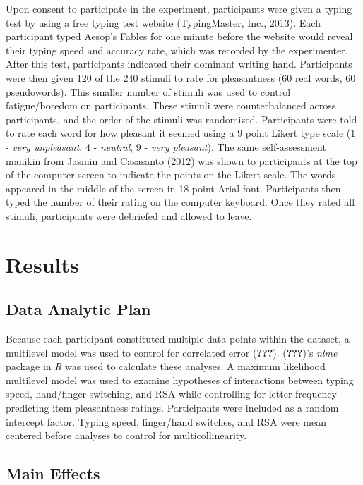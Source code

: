 \documentclass[english,man]{apa6}
\theoremstyle{definition}
\theoremstyle{definition}
\theoremstyle{definition}
\theoremstyle{remark}
\begin{document}
Upon consent to participate in the experiment, participants were given a
typing test by using a free typing test website (TypingMaster, Inc.,
2013). Each participant typed Aesop's Fables for one minute before the
website would reveal their typing speed and accuracy rate, which was
recorded by the experimenter. After this test, participants indicated
their dominant writing hand. Participants were then given 120 of the 240
stimuli to rate for pleasantness (60 real words, 60 pseudowords). This
smaller number of stimuli was used to control fatigue/boredom on
participants. These stimuli were counterbalanced across participants,
and the order of the stimuli was randomized. Participants were told to
rate each word for how pleasant it seemed using a 9 point Likert type
scale (1 - \emph{very unpleasant}, 4 - \emph{neutral}, 9 - \emph{very
pleasant}). The same self-assessment manikin from Jasmin and Casasanto
(2012) was shown to participants at the top of the computer screen to
indicate the points on the Likert scale. The words appeared in the
middle of the screen in 18 point Arial font. Participants then typed the
number of their rating on the computer keyboard. Once they rated all
stimuli, participants were debriefed and allowed to leave.

\section{Results}\label{results}

\subsection{Data Analytic Plan}\label{data-analytic-plan}

Because each participant constituted multiple data points within the
dataset, a multilevel model was used to control for correlated error
({\textbf{???}}). ({\textbf{???}})'s \emph{nlme} package in \emph{R} was
used to calculate these analyses. A maximum likelihood multilevel model
was used to examine hypotheses of interactions between typing speed,
hand/finger switching, and RSA while controlling for letter frequency
predicting item pleasantness ratings. Participants were included as a
random intercept factor. Typing speed, finger/hand switches, and RSA
were mean centered before analyses to control for multicollinearity.

\subsection{Main Effects}\label{main-effects}
\end{document}
